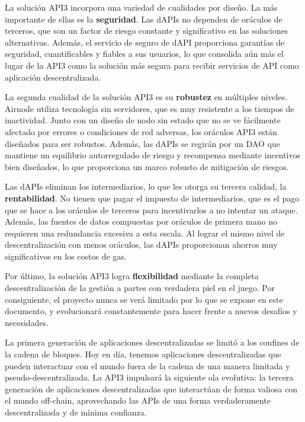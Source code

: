 \documentclass[11pt]{article}
\begin{document}
La solución API3 incorpora una variedad de cualidades por diseño.  La más importante de ellas es la \textbf{seguridad}. Las dAPIs no dependen de oráculos de terceros, que son un factor de riesgo constante y significativo en las soluciones alternativas.  Además, el servicio de seguro de dAPI proporciona garantías de seguridad, cuantificables y fiables a sus usuarios, lo que consolida aún más el lugar de la API3 como la solución más segura para recibir servicios de API como aplicación descentralizada.

La segunda cualidad de la solución API3 es su \textbf{robustez} en múltiples niveles. Airnode utiliza tecnología sin servidores, que es muy resistente a los tiempos de inactividad.  Junto con un diseño de nodo sin estado que no se ve fácilmente afectado por errores o condiciones de red adversas, los oráculos API3 están diseñados para ser robustos. Además, las dAPIs se regirán por un DAO que mantiene un equilibrio autorregulado de riesgo y recompensa mediante incentivos bien diseñados, lo que proporciona un marco robusto de mitigación de riesgos.

Las dAPIs eliminan los intermediarios, lo que les otorga su tercera calidad, la  \textbf{rentabilidad}.
No tienen que pagar el impuesto de intermediarios, que es el pago que se hace a los oráculos de terceros para incentivarlos a no intentar un ataque.  Además, las fuentes de datos compuestas por oráculos de primera mano no requieren una redundancia excesiva a esta escala. Al lograr el mismo nivel de descentralización con menos oráculos, las dAPIs proporcionan ahorros muy significativos en los costos de gas.

Por último, la solución API3 logra \textbf{flexibilidad} mediante la completa descentralización de la gestión a partes con verdadera piel en el juego. Por consiguiente, el proyecto nunca se verá limitado por lo que se expone en este documento, y evolucionará constantemente para hacer frente a nuevos desafíos y necesidades.

La primera generación de aplicaciones descentralizadas se limitó a los confines de la cadena de bloques. Hoy en día, tenemos aplicaciones descentralizadas que pueden interactuar con el mundo fuera de la cadena de una manera limitada y pseudo-descentralizada. La API3 impulsará la siguiente ola evolutiva: la tercera generación de aplicaciones descentralizadas que interactúan de forma valiosa con el mundo off-chain, aprovechando las APIs de una forma verdaderamente descentralizada y de mínima confianza.
\end{document}
